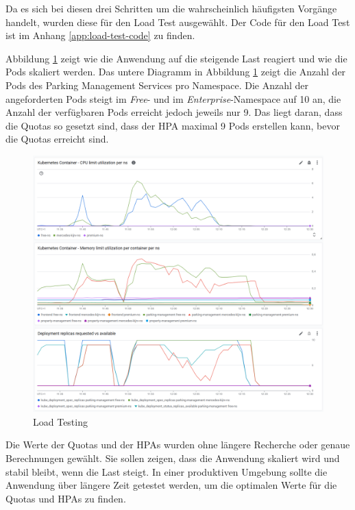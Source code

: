 Da es sich bei diesen drei Schritten um die wahrscheinlich häufigsten Vorgänge handelt, wurden diese für den Load Test ausgewählt. 
Der Code für den Load Test ist im Anhang \ref{app:load-test-code} zu finden.

Abbildung \ref{fig:load-testing} zeigt wie die Anwendung auf die steigende Last reagiert und wie die Pods skaliert werden.
Das untere Diagramm in Abbildung \ref{fig:load-testing} zeigt die Anzahl der Pods des Parking Management Services pro Namespace.
Die Anzahl der angeforderten Pods steigt im \textit{Free}- und im \textit{Enterprise}-Namespace auf 10 an, die Anzahl der verfügbaren 
Pods erreicht jedoch jeweils nur 9. Das liegt daran, dass die Quotas so gesetzt sind, dass der HPA maximal 9 Pods 
erstellen kann, bevor die Quotas erreicht sind.

\begin{figure}[H]
  \centering
  \includegraphics[width=\textwidth]{resources/LoadTest.png}
  \caption{Load Testing}
  \label{fig:load-testing}
\end{figure}

Die Werte der Quotas und der HPAs wurden ohne längere Recherche oder genaue Berechnungen gewählt.
Sie sollen zeigen, dass die Anwendung skaliert wird und stabil bleibt, wenn die Last steigt.
In einer produktiven Umgebung sollte die Anwendung über längere Zeit getestet werden, 
um die optimalen Werte für die Quotas und HPAs zu finden.